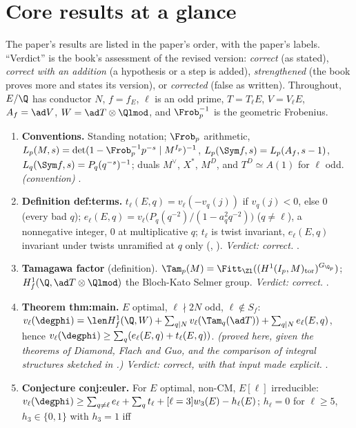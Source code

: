 \begin{sloppypar}
\section*{Core results at a glance}

The paper's results are listed in the paper's order, with the paper's labels. ``Verdict'' is the book's assessment of the revised version: \emph{correct}
(as stated), \emph{correct with an addition} (a hypothesis or a step is added), \emph{strengthened} (the book proves more and states its version), or
\emph{corrected} (false as written). Throughout, $E/\Q$ has conductor $N$, $f=f_E$, $\ell$ is an odd prime, $T=T_\ell E$, $V=V_\ell E$, $A_f=\ad V$, $W=\ad T\otimes\Qlmod$,
and $\Frob_p^{-1}$ is the geometric Frobenius.

\begin{enumerate}[label=\textbf{\thechapter.\arabic*}]
\item \textbf{Conventions.} Standing notation; $\Frob_p$ arithmetic, $L_p(M,s)=\det(1-\Frob_p^{-1}p^{-s}\mid M^{I_p})^{-1}$, $L_p(\Sym f,s)=L_p(A_f,s-1)$, $L_q(\Sym f,s)=P_q(q^{-s})^{-1}$; duals
$M^\vee$, $X^*$, $M^D$, and $T^D\simeq A(1)$ for $\ell$ odd. \emph{(convention)} .
\item \textbf{Definition def:terms.} $t_\ell(E,q)=v_\ell(-v_q(j))$ if $v_q(j)<0$, else $0$ (every bad $q$); $e_\ell(E,q)=v_\ell\bigl(P_q(q^{-2})/(1-a_q^2q^{-2})\bigr)$ ($q\ne\ell$), a nonnegative integer, $0$ at
multiplicative $q$; $t_\ell$ is twist invariant, $e_\ell(E,q)$ invariant under twists unramified at $q$ only (, ). \emph{Verdict: correct.} .
\item \textbf{Tamagawa factor} (definition). $\Tam_p(M)=\Fitt_{\Zl}((H^1(I_p,M)_{\mathrm{tor}})^{G_{\Q_p}})$; $H^1_f(\Q,\ad T\otimes\Qlmod)$ the Bloch-Kato Selmer group. \emph{Verdict: correct.} .
\item \textbf{Theorem thm:main.} $E$ optimal, $\ell\nmid2N$ odd, $\ell\notin S_f$: $v_\ell(\degphi)=\len H^1_f(\Q,W)+\sum_{q\mid N}v_\ell(\Tam_q(\ad T))+\sum_{q\mid N}e_\ell(E,q)$, hence
$v_\ell(\degphi)\ge\sum_q(e_\ell(E,q)+t_\ell(E,q))$. \emph{(proved here, given the theorems of Diamond, Flach and Guo, \cite[Theorem 2.2]{ARS12} and the comparison of integral structures sketched in
.) Verdict: correct, with that input made explicit.} .
\item \textbf{Conjecture conj:euler.} For $E$ optimal, non-CM, $E[\ell]$ irreducible: $v_\ell(\degphi)\ge\sum_{q\ne\ell}e_\ell+\sum_qt_\ell+[\ell=3]w_3(E)-h_\ell(E)$; $h_\ell=0$ for $\ell\ge5$, $h_3\in\{0,1\}$ with $h_3=1$ iff

\end{enumerate}
\end{sloppypar}
